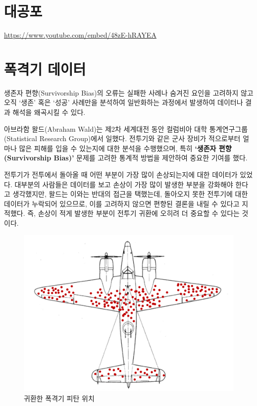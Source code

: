 \documentclass[
  letterpaper,
  chapter,a4paper,showtrims,openright,hidelinks]{oblivoir}
\begin{document}
\hypertarget{uxb300uxacf5uxd3ec}{%
\section{대공포}\label{uxb300uxacf5uxd3ec}}

\url{https://www.youtube.com/embed/48zE-hRAYEA}

\hypertarget{uxd3eduxaca9uxae30-uxb370uxc774uxd130}{%
\section{폭격기 데이터}\label{uxd3eduxaca9uxae30-uxb370uxc774uxd130}}

생존자 편향(Survivorship Bias)의 오류는 실패한 사례나 숨겨진 요인을
고려하지 않고 오직 `생존' 혹은 `성공' 사례만을 분석하여 일반화하는
과정에서 발생하여 데이터나 결과 해석을 왜곡시킬 수 있다.

아브라함 왈드(Abraham Wald)는 제2차 세계대전 동안 컬럼비아 대학
통계연구그룹(Statistical Research Group)에서 일했다. 전투기와 같은 군사
장비가 적으로부터 얼마나 많은 피해를 입을 수 있는지에 대한 분석을
수행했으며, 특히 \textbf{`생존자 편향(Survivorship Bias)'} 문제를 고려한
통계적 방법을 제안하여 중요한 기여를 했다.

전투기가 전투에서 돌아올 때 어떤 부분이 가장 많이 손상되는지에 대한
데이터가 있었다. 대부분의 사람들은 데이터를 보고 손상이 가장 많이 발생한
부분을 강화해야 한다고 생각했지만, 왈드는 이와는 반대의 접근을 택했는데,
돌아오지 못한 전투기에 대한 데이터가 누락되어 있으므로, 이를 고려하지
않으면 편향된 결론을 내릴 수 있다고 지적했다. 즉, 손상이 적게 발생한
부분이 전투기 귀환에 오히려 더 중요할 수 있다는 것이다.

\begin{figure}

{\centering \includegraphics[width=6.98958in,height=\textheight]{images/Survivorship-bias.png}

}

\caption{귀환한 폭격기 피탄 위치}

\end{figure}
\end{document}
